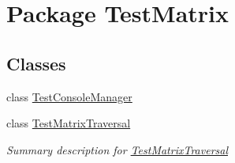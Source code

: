 \hypertarget{namespace_test_matrix}{\section{Package Test\+Matrix}
\label{namespace_test_matrix}
}
\subsection*{Classes}
\begin{DoxyCompactItemize}
\item 
class \hyperlink{class_test_matrix_1_1_test_console_manager}{Test\+Console\+Manager}
\item 
class \hyperlink{class_test_matrix_1_1_test_matrix_traversal}{Test\+Matrix\+Traversal}
\begin{DoxyCompactList}\small\item\em Summary description for \hyperlink{class_test_matrix_1_1_test_matrix_traversal}{Test\+Matrix\+Traversal} \end{DoxyCompactList}\end{DoxyCompactItemize}
